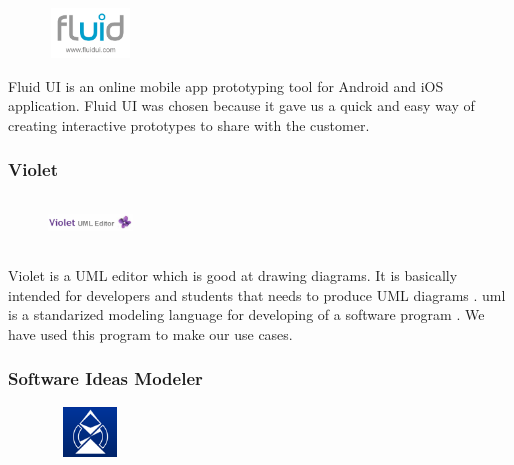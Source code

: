 \begin{figure}
  \vspace{-35pt}
  \begin{center}
    \includegraphics[width=0.2\textwidth, height=50px]{fluidui}
  \end{center}

\end{figure}

Fluid UI \cite{bib:fui} is an online mobile app prototyping tool for Android and iOS application. Fluid UI was chosen because it gave us a quick and easy way of creating interactive prototypes to share with the customer.

\subsubsection{Violet}

\begin{figure}
  \vspace{-125pt}
  \begin{center}
    \includegraphics[width=0.2\textwidth, height=50px]{violetuml}
  \end{center}

\end{figure}
Violet is a UML editor which is good at drawing diagrams. It is \newline
basically intended for developers and students that needs to produce UML \newline
diagrams \cite{bib:violet}. \gls{uml} is a standarized modeling language for developing\newline
of a software program \cite{bib:lmu}. We have used this program to make our use cases.

\subsubsection{Software Ideas Modeler}

\begin{figure}
  \vspace{-35pt}
  \begin{center}
    \includegraphics[width=0.2\textwidth, height=50px]{ideasmodeler}
  \end{center}

\end{figure}

